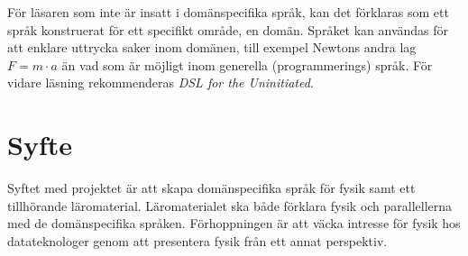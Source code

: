 \documentclass[12pt,a4paper]{article}
\begin{document}
För läsaren som inte är insatt i domänspecifika språk, kan det
förklaras som ett språk konstruerat för ett specifikt område, en
domän. Språket kan användas för att enklare uttrycka saker inom
domänen, till exempel Newtons andra lag $F=m \cdot a$ än vad som är
möjligt inom generella (programmerings) språk. För vidare läsning
rekommenderas \textit{DSL for the Uninitiated}.\cite{DSLU}


%
%
%
%
%
%

\section{Syfte}

Syftet med projektet är att skapa domänspecifika språk för fysik samt ett
tillhörande läromaterial. Läromaterialet ska både förklara fysik och
parallellerna med de domänspecifika språken. Förhoppningen är att väcka intresse
för fysik hos datateknologer genom att presentera fysik från ett annat
perspektiv.
\end{document}
